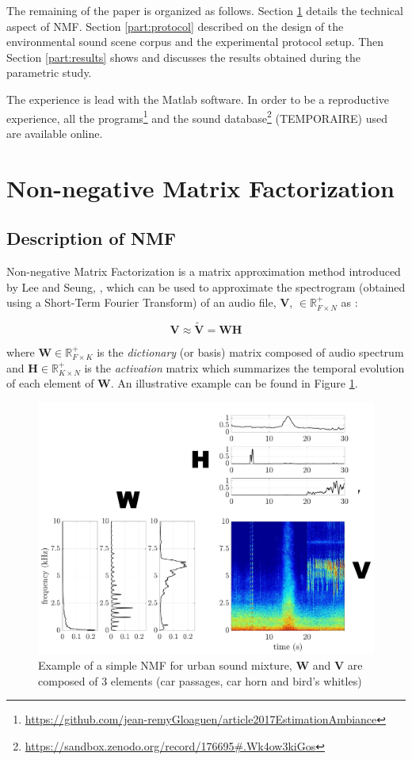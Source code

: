 \documentclass[twocolumn,a4paper,10pt]{article}
\begin{document}
The remaining of the paper is organized as follows. Section \ref{part:nmf} details the technical aspect of NMF. Section \ref{part:protocol} described on the design of the environmental sound scene corpus and the experimental protocol setup. Then Section \ref{part:results} shows and discusses the results obtained during the parametric study.

The experience is lead with the Matlab software. In order to be a reproductive experience, all the programs\footnote{\url{https://github.com/jean-remyGloaguen/article2017EstimationAmbiance}} and the sound database\footnote{\url{https://sandbox.zenodo.org/record/176695#.Wk4ow3kiGos}} (TEMPORAIRE) used are available online.

\section{Non-negative Matrix Factorization}\label{part:nmf}
\subsection{Description of NMF}
Non-negative Matrix Factorization is a matrix approximation method introduced by Lee and Seung, \cite{lee_learning_1999}, which can be used to approximate the spectrogram (obtained using a Short-Term Fourier Transform) of an audio file, $\mathbf{V}$, $\in \mathbb{R}^+_{F \times N}$ as :

\begin{equation}\label{eq:nmf}
\mathbf{V} \approx \mathbf{\tilde{V}} = \mathbf{WH}
\end{equation}

where $\mathbf{W} \in \mathbb{R}^+_{F \times K}$ is the \textit{dictionary} (or basis) matrix composed of audio spectrum and $\mathbf{H} \in \mathbb{R}^+_{K \times N}$ is the \textit{activation} matrix which summarizes the temporal evolution of each element of $\mathbf{W}$. An illustrative example can be found in Figure  \ref{fig:example_NMF}.

\begin{figure}[t]
\centering
\includegraphics[width=0.9\linewidth]{figures/schema_introduction_nmf.pdf}
\caption{Example of a simple NMF  for urban sound mixture, $\mathbf{W}$ and $\mathbf{V}$ are composed of 3 elements (car passages, car horn and bird's whitles)}
\label{fig:example_NMF}
\end{figure}
\end{document}

